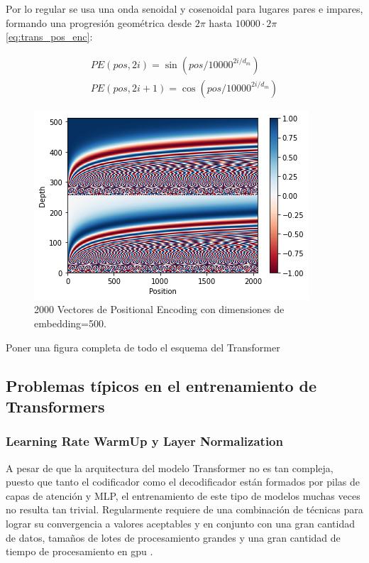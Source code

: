 Por lo regular se usa una onda senoidal y cosenoidal para lugares pares e impares, formando una progresión
geométrica desde $2\pi$ hasta $10000 \cdot 2\pi$ \ref{eq:trans_pos_enc}:

\begin{equation}
    \begin{split}
        PE(pos, 2i) = \sin(pos/10000^{2i/d_m})\\
        PE(pos, 2i+1) = \cos(pos/10000^{2i/d_m})
    \end{split}
    \label{eq:trans_pos_enc}
\end{equation}


\begin{figure}[ht!]
    \centering
    \includegraphics[width=0.5 \textwidth]{Chapters/1. Transformer/Figures/transformer/pos_enc.png}
    \caption{2000 Vectores de Positional Encoding con dimensiones de embedding=500.}
    \label{fig:trans_pos_enc}
\end{figure}

Poner una figura completa de todo el esquema del Transformer

\subsection{Problemas típicos en el entrenamiento de Transformers}

\subsubsection{Learning Rate WarmUp y Layer Normalization}

A pesar de que la arquitectura del modelo Transformer no es tan compleja, puesto que tanto el
codificador como el decodificador están formados por pilas de capas de atención y MLP, el
entrenamiento de este tipo de modelos muchas veces no resulta tan trivial. Regularmente requiere de
una combinación de técnicas para lograr su convergencia a valores aceptables y en conjunto con una
gran cantidad de datos, tamaños de lotes de procesamiento grandes y una gran cantidad de tiempo
de procesamiento en gpu \cite{DBLP:journals/corr/abs-1804-00247}.

